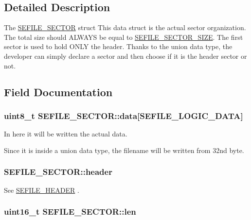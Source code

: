 \subsection{Detailed Description}
The \hyperlink{struct_s_e_f_i_l_e___s_e_c_t_o_r}{S\-E\-F\-I\-L\-E\-\_\-\-S\-E\-C\-T\-O\-R} struct This data struct is the actual sector organization. The total size should A\-L\-W\-A\-Y\-S be equal to \hyperlink{group___sector___defines_gad205a758c315675de3ad9f5f1cbf962d}{S\-E\-F\-I\-L\-E\-\_\-\-S\-E\-C\-T\-O\-R\-\_\-\-S\-I\-Z\-E}. The first sector is used to hold O\-N\-L\-Y the header. Thanks to the union data type, the developer can simply declare a sector and then choose if it is the header sector or not. 

\subsection{Field Documentation}
\hypertarget{struct_s_e_f_i_l_e___s_e_c_t_o_r_a8cadf99c7327a12837c23bb6b97db165}{
\subsubsection[{data}]{\setlength{\rightskip}{0pt plus 5cm}uint8\-\_\-t S\-E\-F\-I\-L\-E\-\_\-\-S\-E\-C\-T\-O\-R\-::data\mbox{[}{\bf S\-E\-F\-I\-L\-E\-\_\-\-L\-O\-G\-I\-C\-\_\-\-D\-A\-T\-A}\mbox{]}}}\label{struct_s_e_f_i_l_e___s_e_c_t_o_r_a8cadf99c7327a12837c23bb6b97db165}
\begin{DoxyVerb}            In here it will be written the actual data.
\end{DoxyVerb}
 Since it is inside a union data type, the filename will be written from 32nd byte. \hypertarget{struct_s_e_f_i_l_e___s_e_c_t_o_r_a4f1dcced2232164ca00c5906400dd083}{
\subsubsection[{header}]{ S\-E\-F\-I\-L\-E\-\_\-\-S\-E\-C\-T\-O\-R\-::header}}\label{struct_s_e_f_i_l_e___s_e_c_t_o_r_a4f1dcced2232164ca00c5906400dd083}
See \hyperlink{struct_s_e_f_i_l_e___h_e_a_d_e_r}{S\-E\-F\-I\-L\-E\-\_\-\-H\-E\-A\-D\-E\-R} . \hypertarget{struct_s_e_f_i_l_e___s_e_c_t_o_r_a7a0bf13d497fbcd2a5ac99511209bff0}{
\subsubsection[{len}]{\setlength{\rightskip}{0pt plus 5cm}uint16\-\_\-t S\-E\-F\-I\-L\-E\-\_\-\-S\-E\-C\-T\-O\-R\-::len}}\label{struct_s_e_f_i_l_e___s_e_c_t_o_r_a7a0bf13d497fbcd2a5ac99511209bff0}
